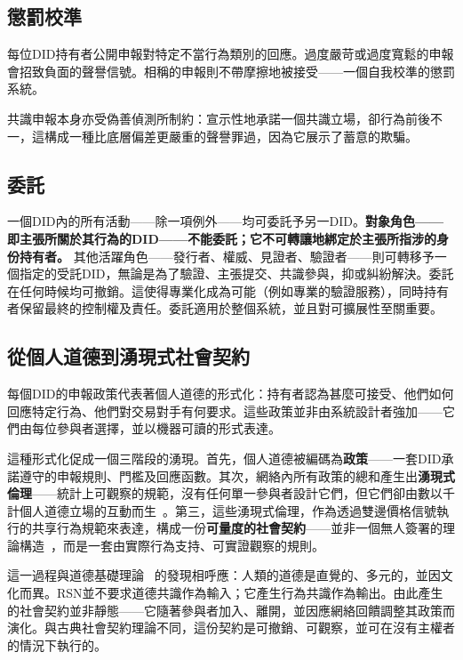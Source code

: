 \documentclass[11pt,a4paper,twocolumn]{article}
\begin{document}
\subsection{懲罰校準}

每位DID持有者公開申報對特定不當行為類別的回應。過度嚴苛或過度寬鬆的申報會招致負面的聲譽信號。相稱的申報則不帶摩擦地被接受——一個自我校準的懲罰系統。

共識申報本身亦受偽善偵測所制約：宣示性地承諾一個共識立場，卻行為前後不一，這構成一種比底層偏差更嚴重的聲譽罪過，因為它展示了蓄意的欺騙。

\subsection{委託}

一個DID內的所有活動——除一項例外——均可委託予另一DID。\textbf{對象角色——即主張所關於其行為的DID——不能委託；它不可轉讓地綁定於主張所指涉的身份持有者。} 其他活躍角色——發行者、權威、見證者、驗證者——則可轉移予一個指定的受託DID，無論是為了驗證、主張提交、共識參與，抑或糾紛解決。委託在任何時候均可撤銷。這使得專業化成為可能（例如專業的驗證服務），同時持有者保留最終的控制權及責任。委託適用於整個系統，並且對可擴展性至關重要。

\subsection{從個人道德到湧現式社會契約}

每個DID的申報政策代表著個人道德的形式化：持有者認為甚麼可接受、他們如何回應特定行為、他們對交易對手有何要求。這些政策並非由系統設計者強加——它們由每位參與者選擇，並以機器可讀的形式表達。

這種形式化促成一個三階段的湧現。首先，個人道德被編碼為\textbf{政策}——一套DID承諾遵守的申報規則、門檻及回應函數。其次，網絡內所有政策的總和產生出\textbf{湧現式倫理}——統計上可觀察的規範，沒有任何單一參與者設計它們，但它們卻由數以千計個人道德立場的互動而生~\cite{durkheim1893}。第三，這些湧現式倫理，作為透過雙邊價格信號執行的共享行為規範來表達，構成一份\textbf{可量度的社會契約}——並非一個無人簽署的理論構造~\cite{rawls1971}，而是一套由實際行為支持、可實證觀察的規則。

這一過程與道德基礎理論~\cite{haidt2012} 的發現相呼應：人類的道德是直覺的、多元的，並因文化而異。RSN並不要求道德共識作為輸入；它產生行為共識作為輸出。由此產生的社會契約並非靜態——它隨著參與者加入、離開，並因應網絡回饋調整其政策而演化。與古典社會契約理論不同，這份契約是可撤銷、可觀察，並可在沒有主權者的情況下執行的。
\end{document}
